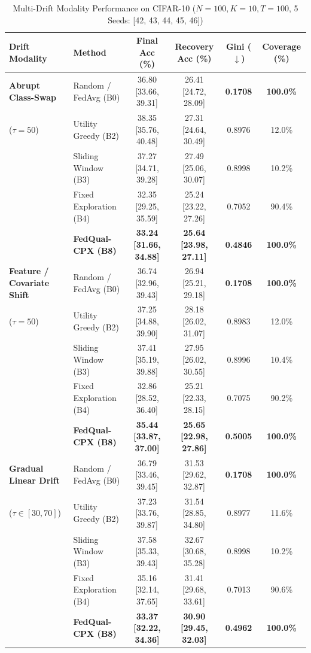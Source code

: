 \documentclass[journal,compsoc]{IEEEtran}
\begin{document}
\begin{table}[t]
\caption{Multi-Drift Modality Performance on CIFAR-10 ($N=100, K=10, T=100$, 5 Seeds: [42, 43, 44, 45, 46])}
\label{tab:multi_drift}
\centering
\begin{tabular}{llcccc}
\toprule
\textbf{Drift Modality} & \textbf{Method} & \textbf{Final Acc (\%)} & \textbf{Recovery Acc (\%)} & \textbf{Gini ($\downarrow$)} & \textbf{Coverage (\%)} \\
\midrule
\textbf{Abrupt Class-Swap} & Random / FedAvg (B0) & 36.80 [33.66, 39.31] & 26.41 [24.72, 28.09] & \textbf{0.1708} & \textbf{100.0\%} \\
($\tau=50$) & Utility Greedy (B2) & 38.35 [35.76, 40.48] & 27.31 [24.64, 30.49] & 0.8976 & 12.0\% \\
& Sliding Window (B3) & 37.27 [34.71, 39.28] & 27.49 [25.06, 30.07] & 0.8998 & 10.2\% \\
& Fixed Exploration (B4) & 32.35 [29.25, 35.59] & 25.24 [23.22, 27.26] & 0.7052 & 90.4\% \\
& \textbf{FedQual-CPX (B8)} & \textbf{33.24 [31.66, 34.88]} & \textbf{25.64 [23.98, 27.11]} & \textbf{0.4846} & \textbf{100.0\%} \\
\midrule
\textbf{Feature / Covariate Shift} & Random / FedAvg (B0) & 36.74 [32.96, 39.43] & 26.94 [25.21, 29.18] & \textbf{0.1708} & \textbf{100.0\%} \\
($\tau=50$) & Utility Greedy (B2) & 37.25 [34.88, 39.90] & 28.18 [26.02, 31.07] & 0.8983 & 12.0\% \\
& Sliding Window (B3) & 37.41 [35.19, 39.88] & 27.95 [26.02, 30.55] & 0.8996 & 10.4\% \\
& Fixed Exploration (B4) & 32.86 [28.52, 36.40] & 25.21 [22.33, 28.15] & 0.7075 & 90.2\% \\
& \textbf{FedQual-CPX (B8)} & \textbf{35.44 [33.87, 37.00]} & \textbf{25.65 [22.98, 27.86]} & \textbf{0.5005} & \textbf{100.0\%} \\
\midrule
\textbf{Gradual Linear Drift} & Random / FedAvg (B0) & 36.79 [33.46, 39.45] & 31.53 [29.62, 32.87] & \textbf{0.1708} & \textbf{100.0\%} \\
($\tau \in [30, 70]$) & Utility Greedy (B2) & 37.23 [33.76, 39.87] & 31.54 [28.85, 34.80] & 0.8977 & 11.6\% \\
& Sliding Window (B3) & 37.58 [35.33, 39.43] & 32.67 [30.68, 35.28] & 0.8998 & 10.2\% \\
& Fixed Exploration (B4) & 35.16 [32.14, 37.65] & 31.41 [29.68, 33.61] & 0.7013 & 90.6\% \\
& \textbf{FedQual-CPX (B8)} & \textbf{33.37 [32.22, 34.36]} & \textbf{30.90 [29.45, 32.03]} & \textbf{0.4962} & \textbf{100.0\%} \\
\bottomrule
\end{tabular}
\end{table}
\end{document}
